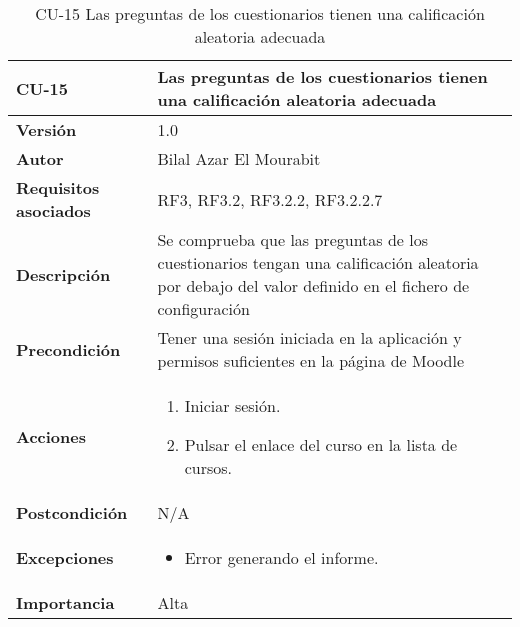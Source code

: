 \begin{table}[H]
	\centering
	\begin{tabularx}{\linewidth}{ p{} p{} }
		\toprule
		\textbf{CU-15}    & \textbf{Las preguntas de los cuestionarios tienen una calificación aleatoria adecuada}\\
		\toprule
		\textbf{Versión}              & 1.0    \\
		\textbf{Autor}                & Bilal Azar El Mourabit \\
		\textbf{Requisitos asociados} & RF3, RF3.2, RF3.2.2, RF3.2.2.7 \\
		\textbf{Descripción}          & Se comprueba que las preguntas de los cuestionarios tengan una calificación aleatoria por debajo del valor definido en el fichero de configuración \\
    		\textbf{Precondición}         & Tener una sesión iniciada en la aplicación y permisos suficientes en la página de Moodle \\
		\textbf{Acciones}             & 
		\begin{enumerate}
			\def\labelenumi{\arabic{enumi}.}
			\tightlist
			\item Iniciar sesión.
            \item Pulsar el enlace del curso en la lista de cursos. 
		\end{enumerate}\\
		\textbf{Postcondición}        & N/A \\
		\textbf{Excepciones}          & \begin{itemize}
		    \item Error generando el informe.
		\end{itemize} \\
		\textbf{Importancia}          & Alta \\
		\bottomrule
	\end{tabularx}
	\caption{CU-15 Las preguntas de los cuestionarios tienen una calificación aleatoria adecuada}
\end{table}

